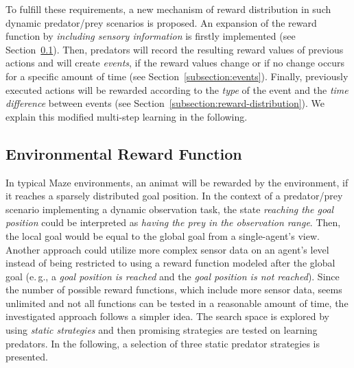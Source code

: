 To fulfill these requirements, a new mechanism of reward distribution in such dynamic predator/prey scenarios is proposed. An expansion of the reward function by \emph{in\-clud\-ing sensory information} is firstly implemented %
(see Section~\ref{subsection:environment-reward-function}). Then, predators will record the resulting reward values of previous actions and will create \emph{events}, if the reward values change or if no change occurs for a specific amount of time (see Section~\ref{subsection:events}). Finally, previously executed actions will be rewarded according to the \emph{type} of the event and the \emph{time difference} between events
(see Section~\ref{subsection:reward-distribution}). We explain this modified multi-step learning in the following. 


\subsection{Environmental Reward Function}
\label{subsection:environment-reward-function}

In typical Maze environments, an animat will be rewarded by the environment, if it reaches a 
sparsely distributed goal position. In the context of a predator/prey scenario implementing a dynamic observation task, the state \emph{reaching the goal position} could be interpreted as \emph{having the prey in the observation range}. Then, the local goal would be equal to the global goal from a single-agent's view. Another approach could utilize more complex sensor data on an agent's level instead of being restricted to using a reward function modeled after the global goal (e.\,g., a \emph{goal position is reached} and the \emph{goal position is not reached}). Since the number of possible reward functions, which include more sensor data, seems unlimited and not all functions can be tested in a reasonable amount of time, the investigated approach follows a simpler idea. The search space is explored by using \emph{static strategies} and then promising strategies are tested on learning predators. In the following, a selection of three static predator strategies is presented. 


